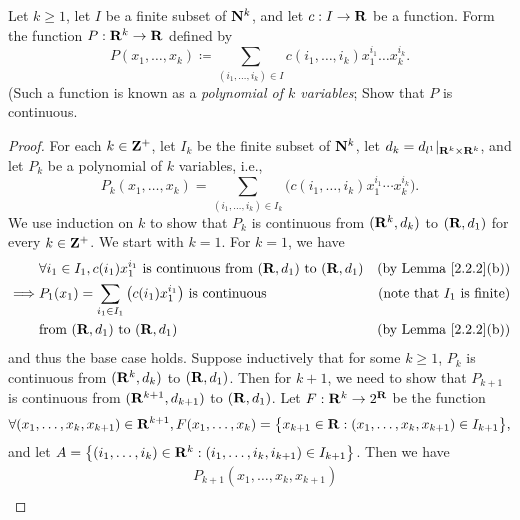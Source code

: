 \begin{exercise}\label{ex 2.2.7}
    Let \(k \geq 1\), let \(I\) be a finite subset of \(\mathbf{N}^k\), and let \(c : I \to \mathbf{R}\) be a function.
    Form the function \(P : \mathbf{R}^k \to \mathbf{R}\) defined by
    \[
        P(x_1, \dots, x_k) \coloneqq \sum_{(i_1, \dots, i_k) \in I} c(i_1, \dots, i_k) x_1^{i_1} \dots x_k^{i_k}.
    \]
    (Such a function is known as a \emph{polynomial of \(k\) variables};
    Show that \(P\) is continuous.
\end{exercise}

\begin{proof}
    For each \(k \in \mathbf{Z}^+\), let \(I_k\) be the finite subset of \(\mathbf{N}^k\), let \(d_k = d_{l^1}|_{\mathbf{R}^k \times \mathbf{R}^k}\), and let \(P_k\) be a polynomial of \(k\) variables, i.e.,
    \[
        P_k(x_1, \dots, x_k) = \sum_{(i_1, \dots, i_k) \in I_k} \big(c(i_1, \dots, i_k) x_1^{i_1} \cdots x_k^{i_k}\big).
    \]
    We use induction on \(k\) to show that \(P_k\) is continuous from \((\mathbf{R}^k, d_k)\) to \((\mathbf{R}, d_1)\) for every \(k \in \mathbf{Z}^+\).
    We start with \(k = 1\).
    For \(k = 1\), we have
    \begin{align*}
                 & \forall i_1 \in I_1, c(i_1) x_1^{i_1} \text{ is continuous from } (\mathbf{R}, d_1) \text{ to } (\mathbf{R}, d_1) & \text{(by Lemma \ref{2.2.2}(b))}     \\
        \implies & P_1(x_1) = \sum_{i_1 \in I_1} \big(c(i_1) x_1^{i_1}\big) \text{ is continuous}                    & \text{(note that \(I_1\) is finite)} \\
                 & \text{from } (\mathbf{R}, d_1) \text{ to } (\mathbf{R}, d_1)                                                      & \text{(by Lemma \ref{2.2.2}(b))}
    \end{align*}
    and thus the base case holds.
    Suppose inductively that for some \(k \geq 1\), \(P_k\) is continuous from \((\mathbf{R}^k, d_k)\) to \((\mathbf{R}, d_1)\).
    Then for \(k + 1\), we need to show that \(P_{k + 1}\) is continuous from \((\mathbf{R}^{k + 1}, d_{k + 1})\) to \((\mathbf{R}, d_1)\).
    Let \(F : \mathbf{R}^k \to 2^{\mathbf{R}}\) be the function
    \[
        \forall (x_1, \dots, x_k, x_{k + 1}) \in \mathbf{R}^{k + 1}, F(x_1, \dots, x_k) = \big\{x_{k + 1} \in \mathbf{R} : (x_1, \dots, x_k, x_{k + 1}) \in I_{k + 1}\big\},
    \]
    and let \(A = \big\{(i_1, \dots, i_k) \in \mathbf{R}^k : (i_1, \dots, i_k, i_{k + 1}) \in I_{k + 1}\big\}\).
    Then we have
    \begin{align*}
         & P_{k + 1}(x_1, \dots, x_k, x_{k + 1})                                                                                                                                                                        \\

\end{align*}
\end{proof}
